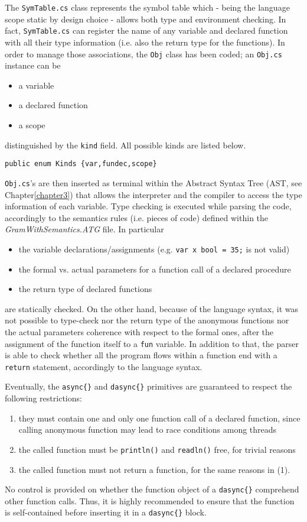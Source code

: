 The \texttt{SymTable.cs} class represents the \fwap symbol table which - being the language scope static by design choice - allows both type and environment checking. In fact, \texttt{SymTable.cs} can register the name of any variable and declared function with all their type information (i.e. also the return type for the functions). In order to manage those associations, the \texttt{Obj} class has been coded; an \texttt{Obj.cs} instance can be

\begin{itemize}
	\item a variable
	\item a declared function
	\item a scope
\end{itemize}

distinguished by the \texttt{kind} field. All possible kinds are listed below.

\begin{lstlisting}[caption=Labels for \texttt{Node}'s.]
public enum Kinds {var,fundec,scope}
\end{lstlisting}

\texttt{Obj.cs}'s are then inserted as terminal within the Abstract Syntax Tree (AST, see Chapter\ref{chapter3}) that allows the interpreter and the compiler to access the type information of each variable. Type checking is executed while parsing the \fwap code, accordingly to the semantics rules (i.e. pieces of code) defined within the \textit{GramWithSemantics.ATG} file. In particular
\begin{itemize}
	\item the variable declarations/assignments (e.g. \texttt{var x bool = 35;} is not valid)
	\item the formal vs. actual parameters for a function call of a declared procedure
	\item the return type of declared functions 
\end{itemize}
are statically checked. On the other hand, because of the language syntax, it was not possible to type-check nor the return type of the anonymous functions nor the actual parameters coherence with respect to the formal ones, after the assignment of the function itself to a \texttt{fun} variable. In addition to that, the parser is able to check whether all the program flows within a function end with a \texttt{return} statement, accordingly to the language syntax. 

Eventually, the \texttt{async\{\}} and \texttt{dasync\{\}} primitives are guaranteed to respect the following restrictions:
\begin{enumerate}
	\item they must contain one and only one function call of a declared function, since calling anonymous function may lead to race conditions among threads
	\item the called function must be \texttt{println()} and \texttt{readln()} free, for trivial reasons
	\item the called function must not return a function, for the same reasons in (1).
\end{enumerate}

No control is provided on whether the function object of a \texttt{dasync\{\}} comprehend other function calls. Thus, it is highly recommended to ensure that the function is self-contained before inserting it in a \texttt{dasync\{\}} block. 

